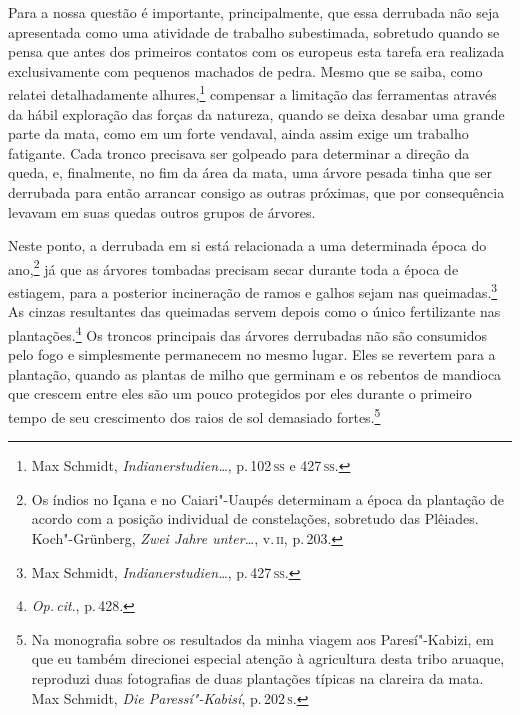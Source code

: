 Para a nossa questão é importante, principalmente, que essa derrubada
não seja apresentada como uma atividade de trabalho subestimada,
sobretudo quando se pensa que antes dos primeiros contatos com os
europeus esta tarefa era realizada exclusivamente com pequenos machados
de pedra. Mesmo que se saiba, como relatei detalhadamente
alhures,\footnote{Max Schmidt, \textit{Indianerstudien\ldots}, p.\,102\,\textsc{ss} e 427\,\textsc{ss}.} compensar a limitação das
ferramentas através da hábil exploração das forças da natureza, quando
se deixa desabar uma grande parte da mata, como em um forte vendaval,
ainda assim exige um trabalho fatigante. Cada tronco precisava ser
golpeado para determinar a direção da queda, e, finalmente, no fim da
área da mata, uma árvore pesada tinha que ser derrubada para então arrancar 
consigo as outras próximas, que por consequência levavam
em suas quedas outros grupos de árvores.

Neste ponto, a derrubada em si está relacionada a uma determinada época
do ano,\footnote{Os índios no Içana e no Caiari"-Uaupés determinam a época
  da plantação de acordo com a posição individual de constelações,
  sobretudo das Plêiades. Koch"-Grünberg, \textit{Zwei Jahre unter\ldots}, v.\,\textsc{ii}, p.\,203.} já que as árvores tombadas
precisam secar durante toda a época de estiagem, para a
posterior incineração de ramos e galhos sejam nas
queimadas.\footnote{Max Schmidt, \textit{Indianerstudien\ldots}, p.\,427\,\textsc{ss}.} As cinzas resultantes das queimadas
servem depois como o único fertilizante nas plantações.\footnote{\textit{Op.\,cit}., p.\,428.} Os troncos principais das árvores derrubadas não são
consumidos pelo fogo e simplesmente permanecem no mesmo lugar. Eles se
revertem para a plantação, quando as plantas de milho que germinam e os
rebentos de mandioca que crescem entre eles são um pouco protegidos
por eles durante o primeiro tempo de seu crescimento dos raios de sol
demasiado fortes.\footnote{Na monografia sobre os resultados da minha viagem aos
Paresí"-Kabizi, em que eu também direcionei especial atenção à
agricultura desta tribo aruaque, reproduzi duas fotografias de duas plantações
típicas na clareira da mata. Max Schmidt, \textit{Die Paressí"-Kabisí}, p.\,202\,\textsc{s}.}

